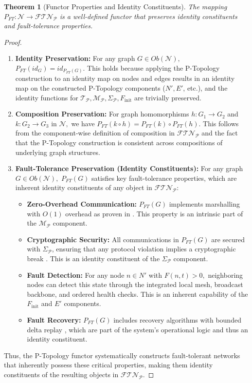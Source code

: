 \documentclass[10pt]{article}
\newtheorem{theorem}{Theorem}[section]
\begin{document}
\begin{theorem}[Functor Properties and Identity Constituents]
The mapping $P_{FT}:\mathcal{N}\rightarrow\mathcal{FTN}_{\mathcal{P}}$ is a well-defined functor that preserves identity constituents and fault-tolerance properties.
\end{theorem}
\begin{proof}
\begin{enumerate}
    \item \textbf{Identity Preservation:} For any graph $G\in Ob(\mathcal{N}),$ $P_{FT}(id_{G})=id_{P_{FT}(G)}.$ This holds because applying the P-Topology construction to an identity map on nodes and edges results in an identity map on the constructed P-Topology components ($N', E'$, etc.), and the identity functions for $\mathcal{T}_{\mathcal{P}}, \mathcal{M}_{\mathcal{P}}, \Sigma_{\mathcal{P}}, F_{\text{init}}$ are trivially preserved.
    \item \textbf{Composition Preservation:} For graph homomorphisms $h:G_{1}\rightarrow G_{2}$ and $k:G_{2}\rightarrow G_{3}$ in $\mathcal{N},$ we have $P_{FT}(k\circ h)=P_{FT}(k)\circ P_{FT}(h).$ This follows from the component-wise definition of composition in $\mathcal{FTN}_{\mathcal{P}}$ and the fact that the P-Topology construction is consistent across compositions of underlying graph structures.
    \item \textbf{Fault-Tolerance Preservation (Identity Constituents):} For any graph $G\in Ob(\mathcal{N}),$ $P_{FT}(G)$ satisfies key fault-tolerance properties, which are inherent identity constituents of any object in $\mathcal{FTN}_{\mathcal{P}}$:
    \begin{itemize}
        \item \textbf{Zero-Overhead Communication:} $P_{FT}(G)$ implements marshalling with $O(1)$ overhead as proven in \cite{OBINexusDataMarshalling}. This property is an intrinsic part of the $\mathcal{M}_{\mathcal{P}}$ component.
        \item \textbf{Cryptographic Security:} All communications in $P_{FT}(G)$ are secured with $\Sigma_{\mathcal{P}}$, ensuring that any protocol violation implies a cryptographic break \cite{OBINexusDataMarshalling}. This is an identity constituent of the $\Sigma_{\mathcal{P}}$ component.
        \item \textbf{Fault Detection:} For any node $n\in N'$ with $F(n,t)>0,$ neighboring nodes can detect this state through the integrated local mesh, broadcast backbone, and ordered health checks. This is an inherent capability of the $F_{\text{init}}$ and $E'$ components.
        \item \textbf{Fault Recovery:} $P_{FT}(G)$ includes recovery algorithms with bounded delta replay \cite{OBINexusDataMarshalling}, which are part of the system's operational logic and thus an identity constituent.
    \end{itemize}
\end{enumerate}
Thus, the P-Topology functor systematically constructs fault-tolerant networks that inherently possess these critical properties, making them identity constituents of the resulting objects in $\mathcal{FTN}_{\mathcal{P}}$.
\end{proof}
\end{document}
